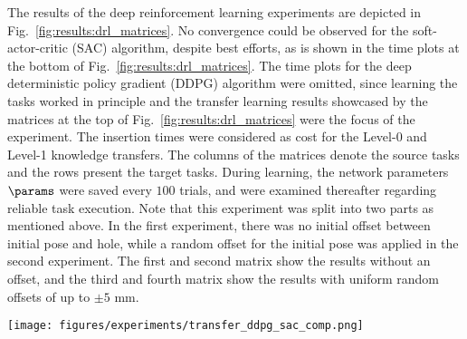The results of the deep reinforcement learning experiments are depicted in Fig.~\ref{fig:results:drl_matrices}.
No convergence could be observed for the soft-actor-critic (SAC) algorithm, despite best efforts, as is shown in the time plots at the bottom of Fig.~\ref{fig:results:drl_matrices}.
 The time plots for the deep deterministic policy gradient (DDPG) algorithm \cite{Lillicrap.2015} were omitted, since learning the tasks worked in principle and the transfer learning results showcased by the matrices at the top of Fig.~\ref{fig:results:drl_matrices} were the focus of the experiment.
The insertion times were considered as cost for the Level-0 and Level-1 knowledge transfers.
The columns of the matrices denote the source tasks and the rows present the target tasks.
During learning, the network parameters $\params$ were saved every $100$ trials, and were examined thereafter regarding reliable task execution.
Note that this experiment was split into two parts as mentioned above.
In the first experiment, there was no initial offset between initial pose and hole, while a random offset for the initial pose was applied in the second experiment.
The first and second matrix show the results without an offset, and the third and fourth matrix show the results with uniform random offsets of up to $\pm 5\text{ mm}$.

\begin{figure*}[ht!]
    \centering
    \texttt{[image: figures/experiments/transfer\_ddpg\_sac\_comp.png]}
    \caption{\textbf{Top}) The transfer learning performance of DDPG. \textbf{Bottom}) A representation of the SAC algorithm's learning performance in the insertion task. 
    Graphs are shown for the $30$~mm, $40$~mm, and $60$~mm pegs. The rewards above the green line indicate successful trials. For the 30 mm and the 40 mm pegs, no successful trials were observed. While successful trials were observed for the 60 mm peg, these were random and not systemically exploited. }
    \label{fig:results:drl_matrices}
\end{figure*}

